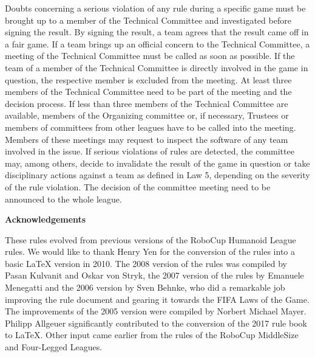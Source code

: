Doubts concerning a serious violation of any rule during a specific game must be
brought up to a member of the Technical Committee and investigated before
 signing the result.
By signing the result, a team agrees that the result came off in
a fair game.
If a team brings up an official concern to the Technical Committee, a meeting of
the Technical Committee must be called as soon as possible.
If the team of a member of the Technical Committee is directly involved in the
game in question, the respective member is excluded from the meeting.
At least three members of the Technical Committee need to be part of the meeting
and the decision process.
If less than three members of the Technical Committee are available,
members of the Organizing committee or, if necessary,
Trustees or members of committees from other leagues have to be called into the
meeting.
Members of these meetings may request to inspect the 
 software of any team involved in the issue.
If serious violations of rules 
are detected, the committee may, among others, decide to invalidate the result
of the game in question or take disciplinary actions against a team as defined
in Law 5, depending on the severity of the rule violation.
The decision of the committee meeting need to be announced to the whole league.

\bigskip

{\bfseries Acknowledgements}

\headlinebox

These rules evolved from previous versions of the RoboCup Humanoid League rules. We would like to thank Henry Yen for the conversion of the rules into a basic LaTeX version in 2010. The 2008 version of the rules was compiled by Pasan Kulvanit and Oskar von Stryk, the 2007 version of the rules by Emanuele Menegatti and the 2006 version by Sven Behnke, who did a remarkable job improving the rule document and gearing it towards the FIFA Laws of the Game. The improvements of the 2005 version were compiled by Norbert Michael Mayer. Philipp Allgeuer significantly contributed to the conversion of the 2017 rule book to LaTeX.  Other input came earlier from the rules of the RoboCup MiddleSize and Four-Legged Leagues.

